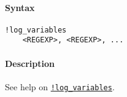 


	\paragraph{Syntax}

\begin{verbatim}
!log_variables
    <REGEXP>, <REGEXP>, ...
\end{verbatim}

\paragraph{Description}

See help on \href{modellang/logvariables}{\texttt{!log\_variables}}.


